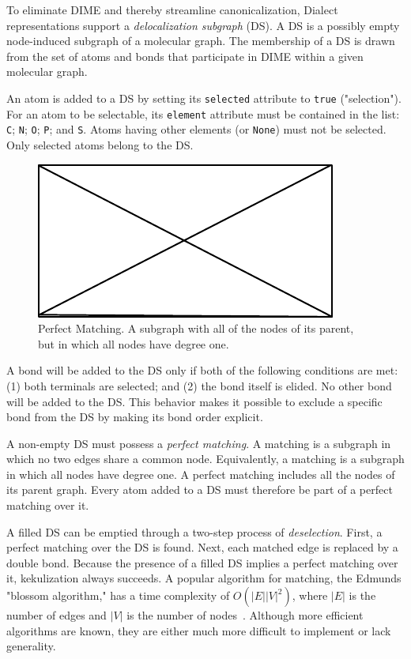 \documentclass{article}
\def\ttt{\texttt}
\begin{document}
To eliminate DIME and thereby streamline canonicalization, Dialect representations support a \textit{delocalization subgraph} (DS). A DS is a possibly empty node-induced subgraph of a molecular graph. The membership of a DS is drawn from the set of atoms and bonds that participate in DIME within a given molecular graph.

An atom is added to a DS by setting its \ttt{selected} attribute to \ttt{true} ("selection"). For an atom to be selectable, its \ttt{element} attribute must be contained in the list: \ttt{C}; \ttt{N}; \ttt{O}; \ttt{P}; and \ttt{S}. Atoms having other elements (or \ttt{None}) must not be selected. Only selected atoms belong to the DS.

\begin{figure}
    \centering
    \includegraphics{filler}
    \caption{Perfect Matching. A subgraph with all of the nodes of its parent, but in which all nodes have degree one.}
    \label{fig:perfect-matching}
\end{figure}

A bond will be added to the DS only if both of the following conditions are met: (1) both terminals are selected; and (2) the bond itself is elided. No other bond will be added to the DS. This behavior makes it possible to exclude a specific bond from the DS by making its bond order explicit.

A non-empty DS must possess a \textit{perfect matching}. A matching is a subgraph in which no two edges share a common node. Equivalently, a matching is a subgraph in which all nodes have degree one. A perfect matching includes all the nodes of its parent graph. Every atom added to a DS must therefore be part of a perfect matching over it.

A filled DS can be emptied through a two-step process of \textit{deselection}. First, a perfect matching over the DS is found. Next, each matched edge is replaced by a double bond. Because the presence of a filled DS implies a perfect matching over it, kekulization always succeeds. A popular algorithm for matching, the Edmunds "blossom algorithm," has a time complexity of $O(|E||V|^2)$, where $|E|$ is the number of edges and $|V|$ is the number of nodes~\cite{edmonds:1965}. Although more efficient algorithms are known, they are either much more difficult to implement or lack generality.
\end{document}
